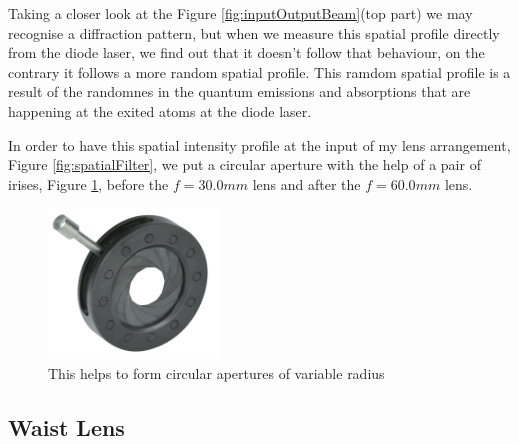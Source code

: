 Taking a closer look at the Figure  \ref{fig:inputOutputBeam}(top part) we may recognise a diffraction pattern, but when we measure this spatial profile directly from the diode laser, we find out that it doesn't follow that behaviour, on the contrary 
it follows a more random spatial profile. This ramdom spatial profile is a result of the randomnes in the
quantum emissions and absorptions that are happening at the exited atoms at the diode laser\cite{hecht}.

In order to have this spatial intensity profile at the input of my lens arrangement, Figure \ref{fig:spatialFilter},
we put a circular aperture with the help of a pair of irises, Figure \ref{fig:iris}, before the $f=30.0 mm$ lens and after the $f=60.0mm$ lens.
\begin{figure}[h!]
\centering
\includegraphics[width=0.4\textwidth]{Figures/iris.jpg}
\caption{This helps to form circular apertures of variable radius} 
\label{fig:iris}
\end{figure}


\subsection{Waist Lens}


